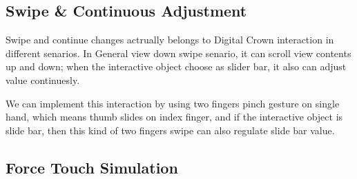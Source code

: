 \subsection{Swipe \& Continuous Adjustment}

%
Swipe and continue changes actrually belongs to Digital Crown interaction in different senarios. In General view down swipe senario, it can scroll view contents up and down; when the interactive object choose as slider bar, it also can adjust value continuesly.

%
We can implement this interaction by using two fingers pinch gesture on single hand, which means thumb slides on index finger, and if the interactive object is slide bar, then this kind of two fingers swipe can also regulate slide bar value.

\subsection{Force Touch Simulation}
\label{sub:force-touch-simu}

